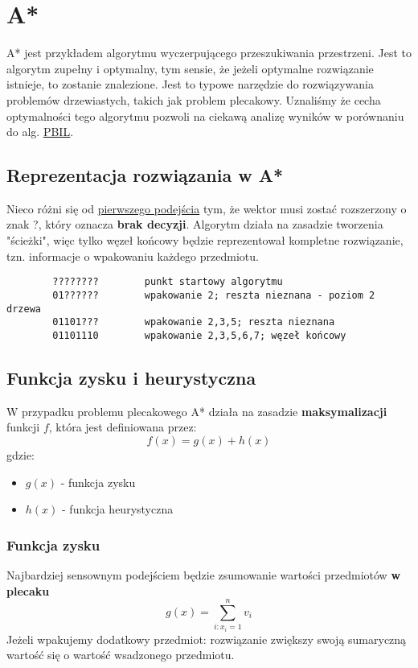\documentclass[11pt]{article}
\begin{document}
\section{A*}
\label{sec:orgb52f974}
A* jest przykładem algorytmu wyczerpującego przeszukiwania przestrzeni. Jest to algorytm zupełny i optymalny, tym sensie, że jeżeli optymalne rozwiązanie istnieje, to zostanie znalezione. Jest to typowe narzędzie do rozwiązywania problemów drzewiastych, takich jak problem plecakowy. Uznaliśmy że cecha optymalności tego algorytmu pozwoli na ciekawą analizę wyników w porównaniu do alg. \hyperref[sec:org90c2bcd]{\uline{PBIL}}.
\subsection{Reprezentacja rozwiązania w A*}
\label{sec:orgaf0d6bb}
Nieco różni się od \hyperref[sec:org9d66316]{pierwszego podejścia} tym, że wektor musi zostać rozszerzony o znak ?, który oznacza \textbf{brak decyzji}. Algorytm działa na zasadzie tworzenia "ścieżki", więc tylko węzeł końcowy będzie reprezentował kompletne rozwiązanie, tzn. informacje o wpakowaniu każdego przedmiotu.
\begin{verbatim}
        ????????        punkt startowy algorytmu
        01??????        wpakowanie 2; reszta nieznana - poziom 2 drzewa
        01101???        wpakowanie 2,3,5; reszta nieznana
        01101110        wpakowanie 2,3,5,6,7; węzeł końcowy
\end{verbatim}
\subsection{Funkcja zysku i heurystyczna}
\label{sec:org6d52087}
W przypadku problemu plecakowego A* działa na zasadzie \textbf{maksymalizacji} funkcji \(f\), która jest definiowana przez:
$$
        f(x) = g(x) + h(x)
$$
gdzie:
\begin{itemize}
\item \(g(x)\) - funkcja zysku
\item \(h(x)\) - funkcja heurystyczna
\end{itemize}
\subsubsection{Funkcja zysku}
\label{sec:orgc54a827}
Najbardziej sensownym podejściem będzie zsumowanie wartości przedmiotów \textbf{w plecaku}
$$
        g(x) = \sum_{i:x_i=1}^n{v_i}
$$
Jeżeli wpakujemy dodatkowy przedmiot: rozwiązanie zwiększy swoją sumaryczną wartość się o wartość wsadzonego przedmiotu.
\end{document}
